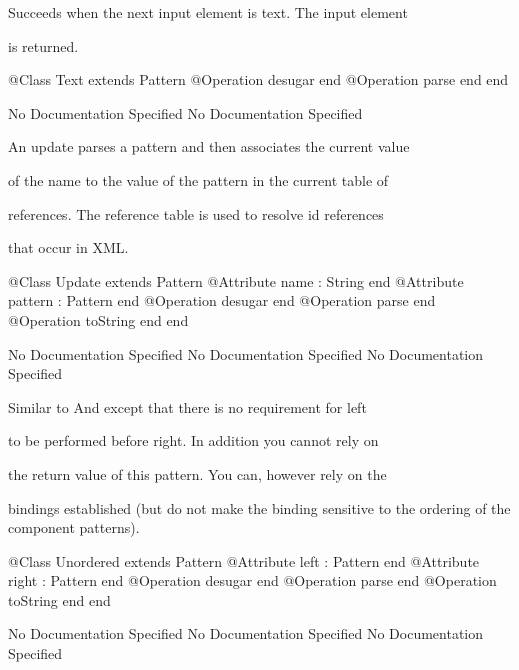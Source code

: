       Succeeds when the next input element is text. The input element

      is returned.
\begin{Interface}
@Class Text extends Pattern
  @Operation desugar end
  @Operation parse end
end
\end{Interface}
No Documentation Specified
No Documentation Specified

      An update parses a pattern and then associates the current value

      of the name to the value of the pattern in the current table of

      references. The reference table is used to resolve id references

      that occur in XML.
\begin{Interface}
@Class Update extends Pattern
  @Attribute name : String end
  @Attribute pattern : Pattern end
  @Operation desugar end
  @Operation parse end
  @Operation toString end
end
\end{Interface}
No Documentation Specified
No Documentation Specified
No Documentation Specified

      Similar to And except that there is no requirement for left

      to be performed before right. In addition you cannot rely on

      the return value of this pattern. You can, however rely on the

      bindings established (but do not make the binding sensitive 
      to the ordering of the component patterns).
\begin{Interface}
@Class Unordered extends Pattern
  @Attribute left : Pattern end
  @Attribute right : Pattern end
  @Operation desugar end
  @Operation parse end
  @Operation toString end
end
\end{Interface}
No Documentation Specified
No Documentation Specified
No Documentation Specified

